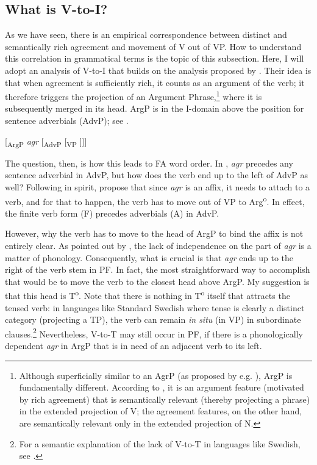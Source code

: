 \documentclass[output=paper,colorlinks,citecolor=brown,draft,draftmode]{langscibook}
\begin{document}
\subsection{What is V-to-I?}\label{sec:petzell:5.1}


As we have seen, there is an empirical correspondence between distinct and semantically rich agreement and movement of V out of VP. How to understand this correlation in grammatical terms is the topic of this subsection. Here, I will adopt an analysis of V-to-I that builds on the analysis proposed by \citet{KoenemanZeijlstra2014}. Their idea is that when agreement is sufficiently rich, it counts as an argument of the verb; it therefore triggers the projection of an Argument Phrase,\footnote{Although superficially similar to an AgrP (as proposed by e.g. \citealt{Chomsky1995}), ArgP is fundamentally different. According to \citet[600]{KoenemanZeijlstra2014}, it is an argument feature (motivated by rich agreement) that is semantically relevant (thereby projecting a phrase) in the extended projection of V; the agreement features, on the other hand, are semantically relevant only in the extended projection of N.} where it is subsequently merged in its head. ArgP is in the I-domain above the position for sentence adverbials (AdvP); see .


\ea\label{ex:petzell:30}
[\textsubscript{ArgP} \textit{agr} [\textsubscript{AdvP} [\textsubscript{VP} ]]]\\
\z

The question, then, is how this leads to FA word order. In , \textit{agr} precedes any sentence adverbial in AdvP, but how does the verb end up to the left of AdvP as well? Following \citet{Rohrbacher1999} in spirit, \citet[601]{KoenemanZeijlstra2014} propose that since \textit{agr} is an affix, it needs to attach to a verb, and for that to happen, the verb has to move out of VP to Arg\textsuperscript{o}. In effect, the finite verb form (F) precedes adverbials (A) in AdvP.



However, why the verb has to move to the head of ArgP to bind the affix is not entirely clear. As pointed out by \citet{KoenemanZeijlstra2014}, the lack of independence on the part of \textit{agr} is a matter of phonology. Consequently, what is crucial is that \textit{agr} ends up to the right of the verb stem in PF. In fact, the most straightforward way to accomplish that would be to move the verb to the closest head above ArgP. My suggestion is that this head is T\textsuperscript{o}. Note that there is nothing in T\textsuperscript{o} itself that attracts the tensed verb: in languages like Standard Swedish where tense is clearly a distinct category (projecting a TP), the verb can remain \textit{in situ} (in VP) in subordinate clauses.\footnote{For a semantic explanation of the lack of V-to-T in languages like Swedish, see \citet{Zeijlstra2012}.}  Nevertheless, V-to-T may still occur in PF, if there is a phonologically dependent \textit{agr} in ArgP that is in need of an adjacent verb to its left.
\end{document}
